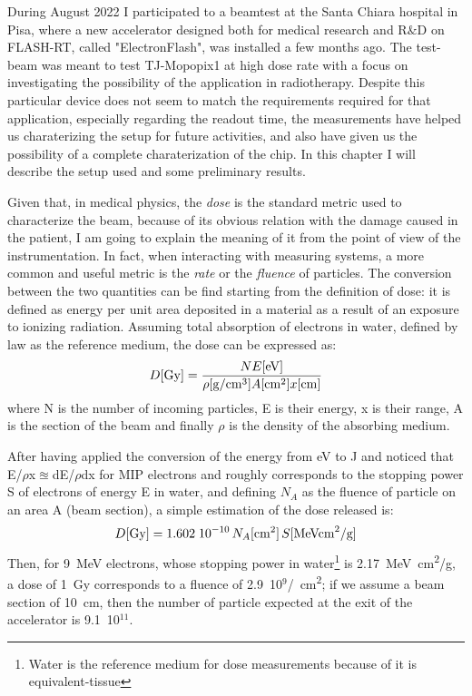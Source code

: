 During August 2022 I participated to a beamtest at the Santa Chiara hospital in Pisa, where a new accelerator designed both for medical research and R$\&$D on FLASH-RT, called "ElectronFlash", was installed a few months ago. 
The test-beam was meant to test TJ-Mopopix1 at high dose rate with a focus on investigating the possibility of the application in radiotherapy. Despite this particular device does not seem to match the requirements required for that application, especially regarding the readout time, the measurements have helped us charaterizing the setup for future activities, and also have given us the possibility of a complete charaterization of the chip.
In this chapter I will describe the setup used and some preliminary results.  


Given that, in medical physics, the \emph{dose} is the standard metric used to characterize the beam, because of its obvious relation with the damage caused in the patient, I am going to explain the meaning of it from the point of view of the instrumentation.
In fact, when interacting with measuring systems, a more common and useful metric is the \emph{rate} or the \emph{fluence} of particles.
The conversion between the two quantities can be find starting from the definition of dose: it is defined as energy per unit area deposited in a material as a result of an exposure to ionizing radiation. 
Assuming total absorption of electrons in water, defined by law as the reference medium, the dose can be expressed as: 
\begin{equation}
   D[\si{Gy}] = \frac{N E[\si{eV}]}{\rho[\si{g/cm}^3] A[\si{cm\squared}] x[\si{cm}]}
\end{equation} 
where N is the number of incoming particles, E is their energy,  x is their range, A is the section of the beam and finally $\rho$ is the density of the absorbing medium.  

After having applied the conversion of the energy from \si{eV} to \si{J} and noticed that E/$\rho$x$\approxeq$dE/$\rho$dx for MIP electrons and roughly corresponds to the stopping power S of electrons of energy E in water, and defining $N_{A}$ as the fluence of particle on an area A (beam section), a simple estimation of the dose released is:
\begin{equation}
   D[\si{Gy}] = 1.602\;10^{-10}\,N_{A}[\si{cm\squared}]\,S[\si{MeV cm\squared /g}]
\end{equation}\label{eq:DOSE_N_counts}
Then, for \SI{9}{MeV} electrons, whose stopping power in water\footnote{Water is the reference medium for dose measurements because of it is equivalent-tissue} is \SI{2.17}{MeV cm\squared/g}, a dose of \SI{1}{Gy} corresponds to a fluence of 2.9~10$^{9}$\si{/cm\squared}; if we assume a beam section of \SI{10}{cm}, then the number of particle expected at the exit of the accelerator is 9.1~10$^{11}$.


